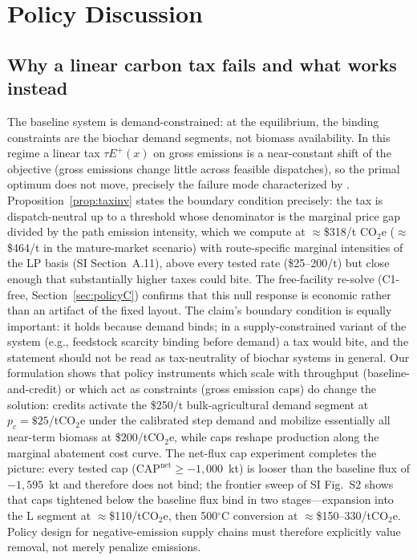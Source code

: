 
\section{Policy Discussion}
\label{sec:discussion}

\subsection{Why a linear carbon tax fails and what works instead}

The baseline system is demand-constrained: at the equilibrium, the binding
constraints are the biochar demand segments, not biomass availability. In this
regime a linear tax $\tau E^{+}(x)$ on gross emissions is a near-constant shift
of the objective (gross emissions change little across feasible dispatches), so
the primal optimum does not move, precisely the failure mode characterized by
\cite{benjaafar2013}. Proposition~\ref{prop:taxinv} states the boundary
condition precisely: the tax is dispatch-neutral up to a threshold whose
denominator is the marginal price gap divided by the path emission intensity,
which we compute at $\approx$\$318/t CO$_2$e ($\approx$\$464/t in the
mature-market scenario) with route-specific marginal
intensities of the LP basis (SI Section~A.11), above every tested rate
(\$25--200/t) but close enough that substantially higher taxes could bite. The
free-facility re-solve (C1-free, Section~\ref{sec:policyC})
confirms that this null response is economic rather than an artifact of the
fixed layout. The claim's boundary condition is equally important: it holds
because demand binds; in a supply-constrained variant of the system
(e.g., feedstock scarcity binding before demand) a tax would bite, and the
statement should not be read as tax-neutrality of biochar systems in general.
Our formulation shows that policy instruments which
scale with throughput (baseline-and-credit) or which act as
constraints (gross emission caps) do change the solution: credits
activate the \$250/t bulk-agricultural demand segment at $p_c=\$25$/tCO$_2$e
under the calibrated step demand and
mobilize essentially all near-term biomass at \$200/tCO$_2$e, while caps reshape
production along the marginal abatement cost curve. The net-flux cap
experiment completes the picture: every tested cap
($\mathrm{CAP}^{\mathrm{net}}\ge-1{,}000$~kt) is looser than the baseline flux
of $-1{,}595$~kt and therefore does not bind; the frontier sweep of SI
Fig.~S2 shows that caps tightened below the baseline flux bind in two
stages---expansion into the L segment at $\approx$\$110/tCO$_2$e, then
500$^\circ$C conversion at $\approx$\$150--330/tCO$_2$e. Policy
design for negative-emission supply chains must therefore
explicitly value removal, not merely penalize emissions.

